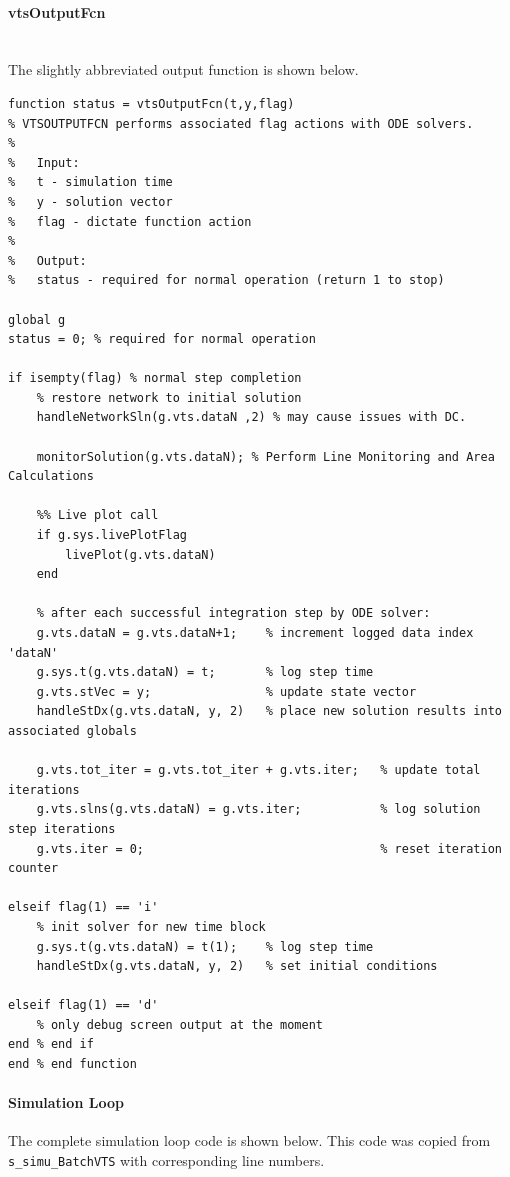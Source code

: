 \documentclass[12pt]{article}
\begin{document}
\paragraph{vtsOutputFcn} \ \\
The slightly abbreviated output function is shown below.
\begin{verbatim}
function status = vtsOutputFcn(t,y,flag)
% VTSOUTPUTFCN performs associated flag actions with ODE solvers.
%
%   Input:
%   t - simulation time
%   y - solution vector
%   flag - dictate function action
%
%   Output:
%   status - required for normal operation (return 1 to stop)

global g 
status = 0; % required for normal operation

if isempty(flag) % normal step completion
    % restore network to initial solution
    handleNetworkSln(g.vts.dataN ,2) % may cause issues with DC.
    
    monitorSolution(g.vts.dataN); % Perform Line Monitoring and Area Calculations 
    
    %% Live plot call
    if g.sys.livePlotFlag
        livePlot(g.vts.dataN)
    end
    
    % after each successful integration step by ODE solver:
    g.vts.dataN = g.vts.dataN+1;    % increment logged data index 'dataN'
    g.sys.t(g.vts.dataN) = t;       % log step time
    g.vts.stVec = y;                % update state vector
    handleStDx(g.vts.dataN, y, 2)   % place new solution results into associated globals
    
    g.vts.tot_iter = g.vts.tot_iter + g.vts.iter;   % update total iterations
    g.vts.slns(g.vts.dataN) = g.vts.iter;           % log solution step iterations
    g.vts.iter = 0;                                 % reset iteration counter
    
elseif flag(1) == 'i' 
    % init solver for new time block
    g.sys.t(g.vts.dataN) = t(1);    % log step time
    handleStDx(g.vts.dataN, y, 2)   % set initial conditions
  
elseif flag(1) == 'd'
    % only debug screen output at the moment
end % end if
end % end function
\end{verbatim}

\pagebreak
\paragraph{Simulation Loop}
The complete simulation loop code is shown below.
This code was copied from \verb|s_simu_BatchVTS| with corresponding line numbers.
\end{document}
